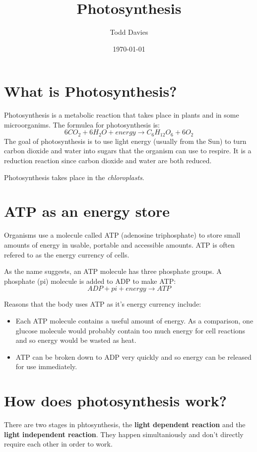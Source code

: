 \documentclass{article}
\title{Photosynthesis}
\author{Todd Davies}
\date{\today}
\begin{document}
\lhead{\today}

\maketitle

\section*{What is Photosynthesis?}
\thispagestyle{empty}
Photosynthesis is a metabolic reaction that takes place in plants and in some microorganims. The formulea for photosynthesis is:
\[
	6CO_2 + 6H_2O + energy \rightarrow C_6H_{12}O_6 + 6O_2
\]
The goal of photosynthesis is to use light energy (usually from the Sun) to turn carbon dioxide and water into sugars that the organism can use to respire. It is a reduction reaction since carbon dioxide and water are both reduced.

Photosynthesis takes place in the \textit{chloroplasts}.
\section*{ATP as an energy store}
Organisms use a molecule called ATP (adenosine triphosphate) to store small amounts of energy in usable, portable and accessible amounts. ATP is often refered to as the energy currency of cells. 

As the name suggests, an ATP molecule has three phosphate groups. A phosphate (pi) molecule is added to ADP to make ATP:
\[
	ADP + pi + energy \rightarrow ATP
\]

Reasons that the body uses ATP as it's energy currency include:
\begin{itemize}
	\item Each ATP molecule contains a useful amount of energy. As a comparison, one glucose molecule would probably contain too much energy for cell reactions and so energy would be wasted as heat.
	\item ATP can be broken down to ADP very quickly and so energy can be released for use immediately.
\end{itemize}

\section*{How does photosynthesis work?}
There are two stages in phtosynthesis, the \textbf{light dependent reaction} and the \textbf{light independent reaction}. They happen simultaniously and don't directly require each other in order to work.
\end{document}
